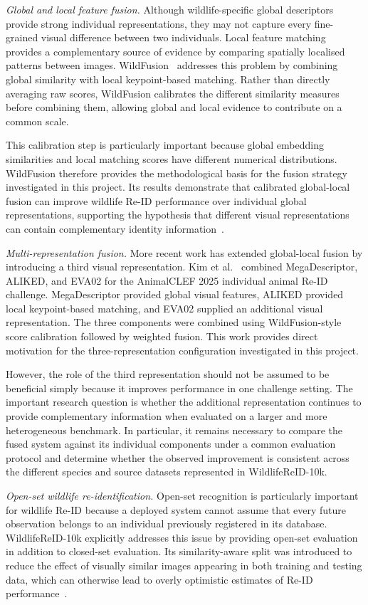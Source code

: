 \documentclass[runningheads]{llncs}
\begin{document}
\emph{Global and local feature fusion.}
Although wildlife-specific global descriptors provide strong individual
representations, they may not capture every fine-grained visual difference
between two individuals. Local feature matching provides a complementary
source of evidence by comparing spatially localised patterns between images.
WildFusion~\cite{cermak2024wildfusion} addresses this problem by combining
global similarity with local keypoint-based matching. Rather than directly
averaging raw scores, WildFusion calibrates the different similarity
measures before combining them, allowing global and local evidence to
contribute on a common scale.

This calibration step is particularly important because global embedding
similarities and local matching scores have different numerical
distributions. WildFusion therefore provides the methodological basis for
the fusion strategy investigated in this project. Its results demonstrate
that calibrated global-local fusion can improve wildlife Re-ID performance
over individual global representations, supporting the hypothesis that
different visual representations can contain complementary identity
information~\cite{cermak2024wildfusion}.

\emph{Multi-representation fusion.}
More recent work has extended global-local fusion by introducing a third
visual representation. Kim et al.~\cite{kim2025fusion} combined
MegaDescriptor, ALIKED, and EVA02 for the AnimalCLEF 2025 individual animal
Re-ID challenge. MegaDescriptor provided global visual features, ALIKED
provided local keypoint-based matching, and EVA02 supplied an additional
visual representation. The three components were combined using
WildFusion-style score calibration followed by weighted fusion. This work
provides direct motivation for the three-representation configuration
investigated in this project.

However, the role of the third representation should not be assumed to be
beneficial simply because it improves performance in one challenge setting.
The important research question is whether the additional representation
continues to provide complementary information when evaluated on a larger
and more heterogeneous benchmark. In particular, it remains necessary to
compare the fused system against its individual components under a common
evaluation protocol and determine whether the observed improvement is
consistent across the different species and source datasets represented in
WildlifeReID-10k.

\emph{Open-set wildlife re-identification.}
Open-set recognition is particularly important for wildlife Re-ID because
a deployed system cannot assume that every future observation belongs to an
individual previously registered in its database. WildlifeReID-10k
explicitly addresses this issue by providing open-set evaluation in addition
to closed-set evaluation. Its similarity-aware split was introduced to
reduce the effect of visually similar images appearing in both training and
testing data, which can otherwise lead to overly optimistic estimates of
Re-ID performance~\cite{adam2025wildlifereid}.
\end{document}
